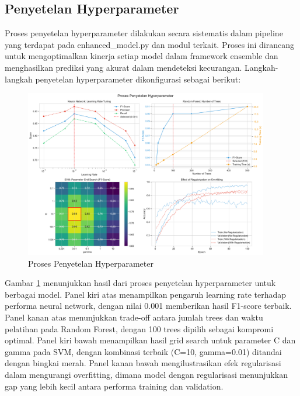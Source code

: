 \subsection{Penyetelan Hyperparameter}
\label{subsec:penyetelanHyperparameter}

Proses penyetelan hyperparameter dilakukan secara sistematis dalam pipeline yang terdapat pada enhanced\_model.py dan modul terkait. Proses ini dirancang untuk mengoptimalkan kinerja setiap model dalam framework ensemble dan menghasilkan prediksi yang akurat dalam mendeteksi kecurangan. Langkah-langkah penyetelan hyperparameter dikonfigurasi sebagai berikut:

\begin{figure}[htbp]
    \centering
    \includegraphics[width=0.95\textwidth]{figures/hyperparameter_tuning.pdf}
    \caption{Proses Penyetelan Hyperparameter}
    \label{fig:hyperparameter_tuning}
\end{figure}

Gambar \ref{fig:hyperparameter_tuning} menunjukkan hasil dari proses penyetelan hyperparameter untuk berbagai model. Panel kiri atas menampilkan pengaruh learning rate terhadap performa neural network, dengan nilai 0.001 memberikan hasil F1-score terbaik. Panel kanan atas menunjukkan trade-off antara jumlah trees dan waktu pelatihan pada Random Forest, dengan 100 trees dipilih sebagai kompromi optimal. Panel kiri bawah menampilkan hasil grid search untuk parameter C dan gamma pada SVM, dengan kombinasi terbaik (C=10, gamma=0.01) ditandai dengan bingkai merah. Panel kanan bawah mengilustrasikan efek regularisasi dalam mengurangi overfitting, dimana model dengan regularisasi menunjukkan gap yang lebih kecil antara performa training dan validation.

